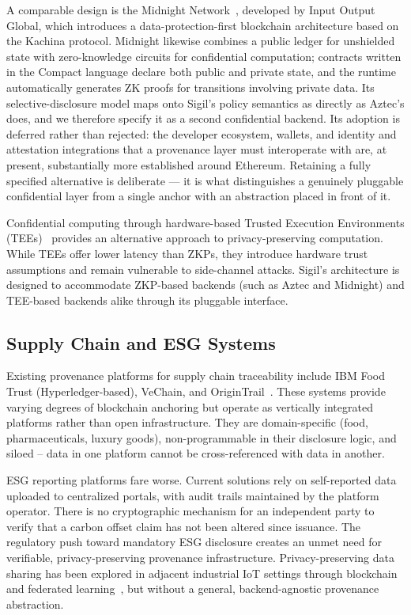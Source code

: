 \documentclass[conference]{IEEEtran}
\begin{document}
A comparable design is the Midnight Network~\cite{midnight2023}, developed by
Input Output Global, which introduces a data-protection-first blockchain
architecture based on the Kachina protocol.  Midnight likewise combines a public
ledger for unshielded state with zero-knowledge circuits for confidential
computation; contracts written in the Compact language declare both public and
private state, and the runtime automatically generates ZK proofs for
transitions involving private data.  Its selective-disclosure model maps onto
Sigil's policy semantics as directly as Aztec's does, and we therefore specify
it as a second confidential backend.  Its adoption is deferred rather than
rejected: the developer ecosystem, wallets, and identity and attestation
integrations that a provenance layer must interoperate with are, at present,
substantially more established around Ethereum.  Retaining a fully specified
alternative is deliberate — it is what distinguishes a genuinely pluggable
confidential layer from a single anchor with an abstraction placed in front of
it.

Confidential computing through hardware-based Trusted Execution Environments
(TEEs)~\cite{liu2023} provides an alternative approach to privacy-preserving
computation.  While TEEs offer lower latency than ZKPs, they introduce hardware
trust assumptions and remain vulnerable to side-channel attacks.  Sigil's
architecture is designed to accommodate ZKP-based backends (such as Aztec and
Midnight) and TEE-based backends alike through its pluggable interface.

\subsection{Supply Chain and ESG Systems}

Existing provenance platforms for supply chain traceability include IBM Food
Trust (Hyperledger-based), VeChain, and OriginTrail~\cite{tang2023}.  These
systems provide varying degrees of blockchain anchoring but operate as
vertically integrated platforms rather than open infrastructure.  They are
domain-specific (food, pharmaceuticals, luxury goods), non-programmable in
their disclosure logic, and siloed -- data in one platform cannot be
cross-referenced with data in another.

ESG reporting platforms fare worse.  Current solutions rely on self-reported
data uploaded to centralized portals, with audit trails maintained by the
platform operator.  There is no cryptographic mechanism for an independent
party to verify that a carbon offset claim has not been altered since
issuance.  The regulatory push toward mandatory ESG disclosure creates an
unmet need for verifiable, privacy-preserving provenance infrastructure.
Privacy-preserving data sharing has been explored in adjacent industrial IoT
settings through blockchain and federated learning~\cite{lu2021}, but without a
general, backend-agnostic provenance abstraction.
\end{document}
